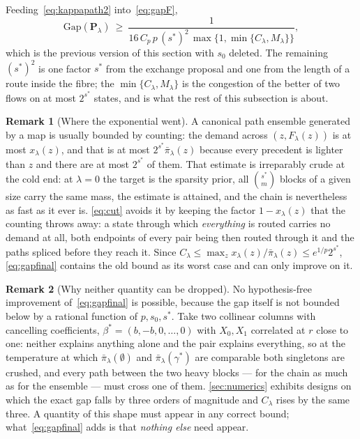 \documentclass[aos]{imsart}
\theoremstyle{plain}
\theoremstyle{definition}
\newtheorem{remark}{Remark}[section]
\begin{document}
    Feeding~\eqref{eq:kappapath2} into~\eqref{eq:gapF},
    \begin{equation}
        \label{eq:gapfinal}
        \mathrm{Gap}(\mathbf{P}_\lambda)\ \geq\
        \frac{1}{16\,C_p\,p\,(s^{\ast})^{2}\,
        \max\bigl\{1,\min\{C_\lambda,M_\lambda\}\bigr\}} ,
    \end{equation}
    which is the previous version of this section with $s_0$ deleted. The
    remaining $(s^{\ast})^{2}$ is one factor $s^{\ast}$ from the exchange
    proposal and one from the length of a route inside the fibre; the
    $\min\{C_\lambda,M_\lambda\}$ is the congestion of the better of two
    flows on at most $2^{s^{\ast}}$ states, and is what the rest of this
    subsection is about.

    \begin{remark}[Where the exponential went]
        \label{rem:tie}
        A canonical path ensemble generated by a map is usually bounded by
        counting: the demand across $(z,F_\lambda(z))$ is at most
        $x_\lambda(z)$, and that is at most $2^{s^{\ast}}\bar\pi_\lambda(z)$
        because every precedent is lighter than $z$ and there are at most
        $2^{s^{\ast}}$ of them. That estimate is irreparably crude at the
        cold end: at $\lambda=0$ the target is the sparsity prior, all
        $\binom{s^{\ast}}{m}$ blocks of a given size carry the same mass,
        the estimate is attained, and the chain is nevertheless as fast as
        it ever is. \eqref{eq:cut} avoids it by keeping the factor
        $1-x_\lambda(z)$ that the counting throws away: a state through
        which \emph{everything} is routed carries no demand at all, both
        endpoints of every pair being then routed through it and the paths
        spliced before they reach it. Since
        $C_\lambda\leq\max_zx_\lambda(z)/\bar\pi_\lambda(z)\leq
        e^{1/p}2^{s^{\ast}}$, \eqref{eq:gapfinal} contains the old bound as its
        worst case and can only improve on it.
    \end{remark}

    \begin{remark}[Why neither quantity can be dropped]
        \label{rem:necessary}
        No hypothesis-free improvement of~\eqref{eq:gapfinal} is possible,
        because the gap itself is not bounded below by a rational function
        of $p,s_0,s^{\ast}$. Take two collinear columns with cancelling
        coefficients, $\beta^{\ast}=(b,-b,0,\dots,0)$ with $X_0,X_1$
        correlated at $r$ close to one: neither explains anything alone and
        the pair explains everything, so at the temperature at which
        $\bar\pi_\lambda(\emptyset)$ and $\bar\pi_\lambda(\gamma^{\ast})$
        are comparable both singletons are crushed, and every path between
        the two heavy blocks --- for the chain as much as for the ensemble
        --- must cross one of them. \cref{sec:numerics} exhibits designs on
        which the exact gap falls by three orders of magnitude and
        $C_\lambda$ rises by the same three. A quantity of this shape must
        appear in any correct bound; what~\eqref{eq:gapfinal} adds is that
        \emph{nothing else} need appear.
    \end{remark}
\end{document}

